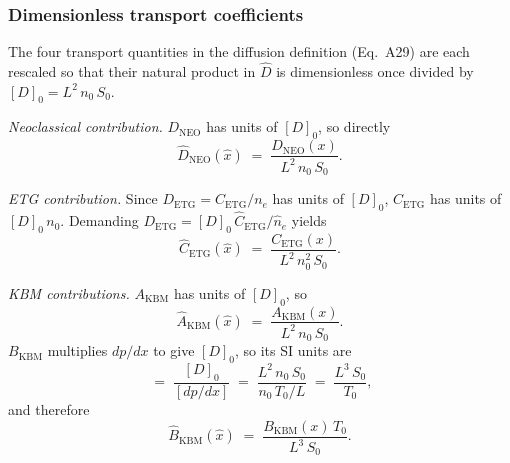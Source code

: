 \documentclass[twocolumn,secnumarabic,amssymb, nobibnotes, aps, prd]{revtex4-2}
\renewcommand{\ne}{n_{e}}  %
\begin{document}
\subsubsection{Dimensionless transport coefficients}

The four transport quantities in the diffusion definition (Eq.~A29) are
each rescaled so that their natural product in $\hat{D}$ is
dimensionless once divided by $[D]_{0}=L^{2}\,n_{0}\,S_{0}$.

\textit{Neoclassical contribution.}
$D_{\mathrm{NEO}}$ has units of $[D]_{0}$, so directly
\begin{equation}
  \hat{D}_{\mathrm{NEO}}(\hat{x})
  \;=\; \frac{D_{\mathrm{NEO}}(x)}{L^{2}\,n_{0}\,S_{0}}.
  \label{eq:hat-D-NEO}
\end{equation}

\textit{ETG contribution.}
Since $D_{\mathrm{ETG}}=C_{\mathrm{ETG}}/\ne$ has units of $[D]_{0}$,
$C_{\mathrm{ETG}}$ has units of $[D]_{0}\,n_{0}$. Demanding
$D_{\mathrm{ETG}}=[D]_{0}\,\hat{C}_{\mathrm{ETG}}/\hat{n}_{e}$ yields
\begin{equation}
  \hat{C}_{\mathrm{ETG}}(\hat{x})
  \;=\; \frac{C_{\mathrm{ETG}}(x)}{L^{2}\,n_{0}^{2}\,S_{0}}.
  \label{eq:hat-C-ETG}
\end{equation}

\textit{KBM contributions.}
$A_{\mathrm{KBM}}$ has units of $[D]_{0}$, so
\begin{equation}
  \hat{A}_{\mathrm{KBM}}(\hat{x})
  \;=\; \frac{A_{\mathrm{KBM}}(x)}{L^{2}\,n_{0}\,S_{0}}.
  \label{eq:hat-A-KBM}
\end{equation}
$B_{\mathrm{KBM}}$ multiplies $dp/dx$ to give $[D]_{0}$, so its
SI units are
\begin{equation}
  [B_{\mathrm{KBM}}]
  \;=\;\frac{[D]_{0}}{[dp/dx]}
  \;=\;\frac{L^{2}\,n_{0}\,S_{0}}{n_{0}\,T_{0}/L}
  \;=\;\frac{L^{3}\,S_{0}}{T_{0}},
\end{equation}
and therefore
\begin{equation}
  \hat{B}_{\mathrm{KBM}}(\hat{x})
  \;=\; \frac{B_{\mathrm{KBM}}(x)\,T_{0}}{L^{3}\,S_{0}}.
  \label{eq:hat-B-KBM}
\end{equation}
\end{document}
